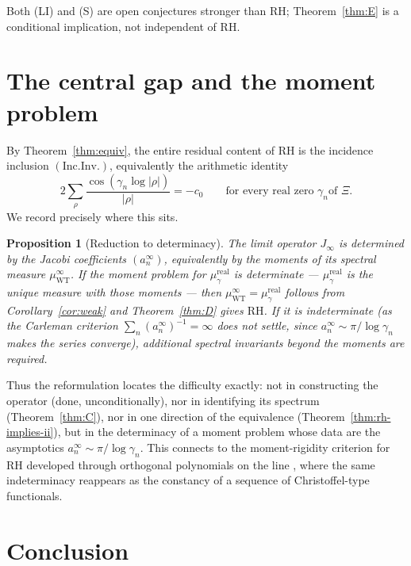 \documentclass[11pt]{amsart}
\newtheorem{proposition}[theorem]{Proposition}
\theoremstyle{definition}
\theoremstyle{remark}
\newcommand{\RH}{\mathrm{RH}}
\newcommand{\Jinf}{J_\infty}
\newcommand{\gamn}{\gamma_n}
\newcommand{\incInv}{(\mathrm{Inc.Inv.})}
\begin{document}
Both (LI) and (S) are open conjectures stronger than $\RH$; Theorem~\ref{thm:E} is a
conditional implication, not independent of $\RH$.

\section{The central gap and the moment problem}\label{sec:gap}

By Theorem~\ref{thm:equiv}, the entire residual content of $\RH$ is the incidence inclusion
$\incInv$, equivalently the arithmetic identity
\[
2\sum_\rho\frac{\cos(\gamn\log|\rho|)}{|\rho|}=-c_0\qquad\text{for every real zero }\gamn\text{
of }\Xi.
\]
We record precisely where this sits.

\begin{proposition}[Reduction to determinacy]\label{prop:moment}
The limit operator $\Jinf$ is determined by the Jacobi coefficients $(a_n^\infty)$, equivalently
by the moments of its spectral measure $\mu_{\mathrm{WT}}^\infty$. If the moment problem for
$\mu_\gamma^{\mathrm{real}}$ is \emph{determinate} --- $\mu_\gamma^{\mathrm{real}}$ is the unique
measure with those moments --- then $\mu_{\mathrm{WT}}^\infty=\mu_\gamma^{\mathrm{real}}$ follows
from Corollary~\ref{cor:weak} and Theorem~\ref{thm:D} gives $\RH$. If it is indeterminate (as
the Carleman criterion $\sum_n(a_n^\infty)^{-1}=\infty$ does not settle, since $a_n^\infty\sim
\pi/\log\gamn$ makes the series converge), additional spectral invariants beyond the moments
are required.
\end{proposition}

Thus the reformulation locates the difficulty exactly: not in constructing the operator (done,
unconditionally), nor in identifying its spectrum (Theorem~\ref{thm:C}), nor in one direction
of the equivalence (Theorem~\ref{thm:rh-implies-ii}), but in the determinacy of a moment
problem whose data are the asymptotics $a_n^\infty\sim\pi/\log\gamn$. This connects to the
moment-rigidity criterion for $\RH$ developed through orthogonal polynomials on the line
\cite{MomentRigidity}, where the same indeterminacy reappears as the constancy of a sequence of
Christoffel-type functionals.

\section{Conclusion}
\end{document}
